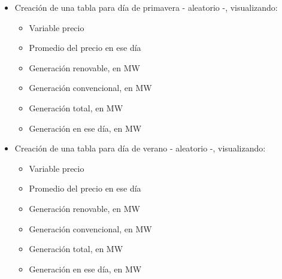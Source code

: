 \documentclass[11pt]{article}
\providecommand{\tightlist}{%
      \setlength{\itemsep}{0pt}\setlength{\parskip}{0pt}}
\begin{document}
    \begin{itemize}
\tightlist
\item
  Creación de una tabla para día de primavera - aleatorio -,
  visualizando:

  \begin{itemize}
  \tightlist
  \item
    Variable precio
  \item
    Promedio del precio en ese día
  \item
    Generación renovable, en MW
  \item
    Generación convencional, en MW
  \item
    Generación total, en MW
  \item
    Generación en ese día, en MW
  \end{itemize}
\item
  Creación de una tabla para día de verano - aleatorio -, visualizando:

  \begin{itemize}
  \tightlist
  \item
    Variable precio
  \item
    Promedio del precio en ese día
  \item
    Generación renovable, en MW
  \item
    Generación convencional, en MW
  \item
    Generación total, en MW
  \item
    Generación en ese día, en MW
  \end{itemize}
\end{itemize}
\end{document}
